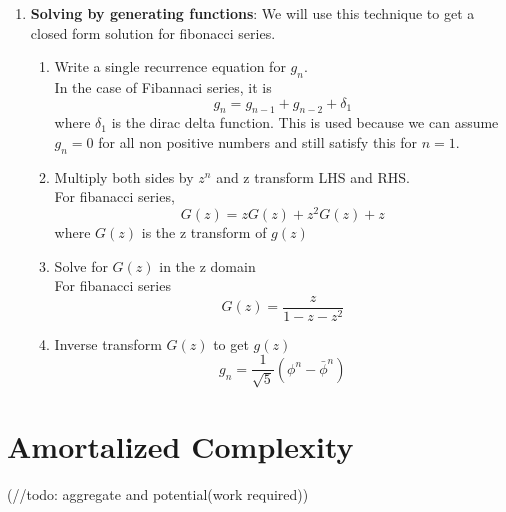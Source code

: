 \documentclass{article}
\begin{document}
\begin{enumerate}
		\item \textbf{Solving by generating functions}:
		We will use this technique to get a closed form solution for fibonacci series.
		\begin{enumerate}
		\item Write a single recurrence equation for $g_n$.\\
		In the case of Fibannaci series, it is
			\[g_n = g_{n-1} + g_{n-2} + \delta_1\]
		where $\delta_1$ is the dirac delta function. This is used because we can assume $g_n=0$ for all non positive numbers and still satisfy this for $n=1$.
		\item Multiply both sides by $z^n$ and z transform LHS and RHS.\\
		For fibanacci series, 
		\begin{equation*}
			G(z)= zG(z)+z^2G(z) + z 
		\end{equation*}
		where $G(z)$ is the z transform of $g(z)$
		\item Solve for $G(z)$ in the z domain\\
		For fibanacci series
		\[G(z) = \frac{z}{1-z-z^2}\]
		\item Inverse transform $G(z)$ to get $g(z)$
		\[g_n = \frac{1}{\sqrt{5}}(\phi^n - \bar{\phi}^n)\]
		\end{enumerate}

	\end{enumerate}


\section{Amortalized Complexity}
(//todo: aggregate and potential(work required))
\end{document}
